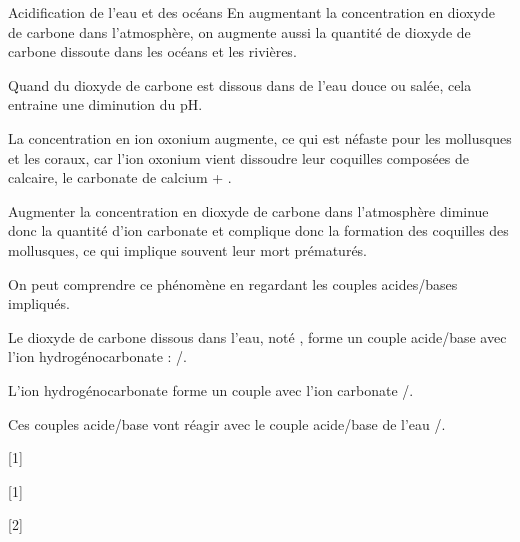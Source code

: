\begin{doc}{Acidification de l'eau et des océans}
  En augmentant la concentration en dioxyde de carbone dans l'atmosphère, on augmente aussi la quantité de dioxyde de carbone dissoute dans les océans et les rivières.
  
  \begin{importants}  
    Quand du dioxyde de carbone est dissous dans de l'eau douce ou salée, cela entraine une diminution du pH.
  \end{importants}
  
  La concentration en ion oxonium \oxonium augmente, ce qui est néfaste pour les mollusques et les coraux, car l'ion oxonium vient dissoudre leur coquilles composées de calcaire, le carbonate de calcium \ionCalcium + \carbonate.

  \begin{importants}
    Augmenter la concentration en dioxyde de carbone dans l'atmosphère diminue donc la quantité d'ion carbonate \carbonate et complique donc la formation des coquilles des mollusques, ce qui implique souvent leur mort prématurés.
  \end{importants}

  On peut comprendre ce phénomène en regardant les couples acides/bases impliqués.
  \begin{listePoints}
    \item Le dioxyde de carbone dissous dans l'eau, noté , forme un couple acide/base avec l'ion hydrogénocarbonate : /\bicarbonate.
    \item L'ion hydrogénocarbonate forme un couple avec l'ion carbonate \bicarbonate/\carbonate.
    \item Ces couples acide/base vont réagir avec le couple acide/base de l'eau \oxonium/\eau.
  \end{listePoints}
\end{doc}


[1]


[1]

[2]